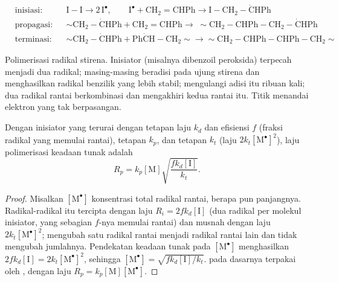 \begin{omfigure}
\begin{align*}
&\text{inisiasi:} && \mathrm{I{-}I} \longrightarrow 2\,\mathrm{I^{\bullet}}, \qquad
\mathrm{I^{\bullet} + CH_2{=}CHPh \longrightarrow I{-}CH_2{-}\dot{C}HPh} \\
&\text{propagasi:} && {\sim}\mathrm{CH_2{-}\dot{C}HPh + CH_2{=}CHPh \longrightarrow}\;
{\sim}\mathrm{CH_2{-}CHPh{-}CH_2{-}\dot{C}HPh} \\
&\text{terminasi:} && {\sim}\mathrm{CH_2{-}\dot{C}HPh + Ph\dot{C}H{-}CH_2}{\sim} \longrightarrow
{\sim}\mathrm{CH_2{-}CHPh{-}CHPh{-}CH_2}{\sim}
\end{align*}

{\small Polimerisasi radikal stirena. Inisiator  (misalnya dibenzoil
peroksida) terpecah menjadi dua radikal; masing-masing beradisi pada ujung
 stirena dan menghasilkan radikal benzilik yang lebih stabil;
 mengulangi adisi itu ribuan kali; dua radikal rantai berkombinasi
dan mengakhiri kedua rantai itu. Titik menandai elektron yang tak
berpasangan.}
\end{omfigure}

\begin{theorem}\label{thm:b2:polymer-synthesis:radical-rate}
Dengan inisiator yang terurai dengan tetapan laju $k_d$ dan efisiensi $f$
(fraksi radikal yang memulai rantai), tetapan  $k_p$, dan tetapan
 $k_t$ (laju  $2k_t
[\mathrm{M^\bullet}]^2$), laju polimerisasi keadaan tunak adalah
\begin{equation*}
R_p = k_p [\mathrm M] \sqrt{\frac{f k_d [\mathrm I]}{k_t}}.
\end{equation*}
\end{theorem}

\begin{proof}
Misalkan $[\mathrm{M^\bullet}]$ konsentrasi total radikal rantai, berapa pun
panjangnya. Radikal-radikal itu tercipta dengan laju $R_i = 2fk_d[\mathrm I]$
(dua radikal per molekul inisiator, yang sebagian $f$-nya
memulai rantai) dan musnah dengan laju $2k_t[\mathrm{M^\bullet}]^2$;
 mengubah satu radikal rantai menjadi radikal rantai lain dan tidak
mengubah jumlahnya. Pendekatan keadaan tunak pada
$[\mathrm{M^\bullet}]$ menghasilkan $2fk_d[\mathrm I] = 2k_t[\mathrm{M^\bullet}]^2$, sehingga $[\mathrm{M^\bullet}] =
\sqrt{fk_d[\mathrm I]/k_t}$.  pada dasarnya terpakai oleh , dengan laju $R_p =
k_p[\mathrm M][\mathrm{M^\bullet}]$.
\end{proof}


